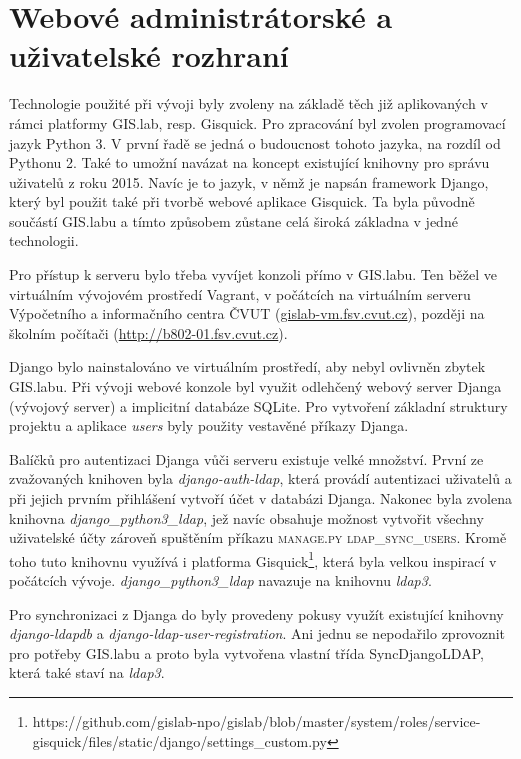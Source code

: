 \section{Webové administrátorské a uživatelské rozhraní}
\label{web-console}
Technologie použité při vývoji byly zvoleny na základě těch již
aplikovaných v rámci platformy GIS.lab, resp. Gisquick. Pro zpracování
byl zvolen programovací jazyk Python 3. V první řadě se jedná o
budoucnost tohoto jazyka, na rozdíl od Pythonu 2. Také to umožní
navázat na koncept existující knihovny pro správu uživatelů z roku
2015. Navíc je to jazyk, v němž je napsán framework Django, který byl
použit také při tvorbě webové aplikace Gisquick. Ta byla původně
součástí GIS.labu a tímto způsobem zůstane celá široká základna v
jedné technologii.

Pro přístup k  serveru bylo třeba vyvíjet konzoli přímo v
GIS.labu. Ten běžel ve virtuálním vývojovém prostředí Vagrant, v
počátcích na virtuálním serveru Výpočetního a informačního centra ČVUT
(\href{gislab-vm.fsv.cvut.cz}{gislab-vm.fsv.cvut.cz}), později na
školním počítači
(\href{http://b802-01.fsv.cvut.cz}{http://b802-01.fsv.cvut.cz}).

Django bylo nainstalováno ve virtuálním prostředí, aby nebyl ovlivněn
zbytek GIS.labu. Při vývoji webové konzole byl využit odlehčený webový
server Djanga (vývojový server) a implicitní databáze SQLite. Pro
vytvoření základní struktury projektu a aplikace \textit{users} byly
použity vestavěné příkazy Djanga.

Balíčků pro autentizaci Djanga vůči  serveru existuje velké
množství. První ze zvažovaných knihoven byla
\textit{django-auth-ldap}, která provádí autentizaci uživatelů a při
jejich prvním přihlášení vytvoří účet v databázi Djanga. Nakonec byla
zvolena knihovna \textit{django\_python3\_ldap}, jež navíc obsahuje
možnost vytvořit všechny uživatelské účty zároveň spuštěním příkazu
\textsc{manage.py ldap\_sync\_users}. Kromě toho tuto knihovnu využívá
i platforma
Gisquick\footnote{https://github.com/gislab-npo/gislab/blob/master/system/roles/service-gisquick/files/static/django/settings\_custom.py},
která byla velkou inspirací v počátcích
vývoje. \textit{django\_python3\_ldap} navazuje na knihovnu
\textit{ldap3}.

Pro synchronizaci z Djanga do  byly provedeny pokusy využít
existující knihovny \textit{django-ldapdb} a
\textit{django-ldap-user-registration}. Ani jednu se nepodařilo
zprovoznit pro potřeby GIS.labu a proto byla vytvořena vlastní třída
\textsf{SyncDjangoLDAP}, která také staví na \textit{ldap3}.

